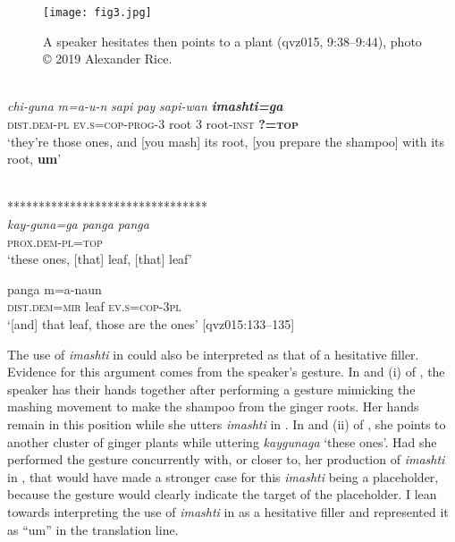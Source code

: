 \documentclass[output=paper]{langscibook}
\begin{document}
  
\begin{figure}
\texttt{[image: fig3.jpg]}
\caption{\label{fig:rice:3} A speaker hesitates then points to a plant (qvz015, 9:38--9:44), photo © 2019 Alexander Rice.}
 \end{figure}

\ea%
\label{ex:rice:5}
\ea \label{ex:rice:5a}
    \glll {} {} {} {} {} {}\\
    {\textit{chi-guna}}  {{\textit{m=a-u-n}}}    {\textit{sapi}}   {\textit{pay}}   {\textit{sapi-wan}} {\textbf{\textit{imashti=ga}}}\\
	{\textsc{dist.dem-pl}}  {\textsc{ev.s=cop-prog-3}}  {root}  {3}  {root-\textsc{inst}}  {\textbf{\textsc{?=top}}}\\
    \glt ‘they’re those ones, and [you mash] its root, [you prepare the shampoo] with its root, \textbf{um}’
\medskip

\ex   \label{ex:rice:5b}
 \\
{********************************}\\
{\textit{kay-guna=ga {\hspace{1cm}} panga {\hspace{0.5cm}} panga}}\\
{\textsc{prox.dem-pl=top {\hspace{0.2cm}} {} {\hspace{1cm}}{}}}\\
\glt ‘these ones, [that] leaf, [that] leaf’
\medskip

\ex \label{ex:rice:5c}  
 {panga}  {m=a-naun}\\
\textsc{dist.dem=mir}    {leaf}  {\textsc{ev.s=cop-3pl}}\\
\glt   ‘[and] that leaf, those are the ones’ [qvz015:133--135]
\z
\z

The use of \textit{imashti} in  could also be interpreted as that of a hesitative filler. Evidence for this argument comes from the speaker’s gesture. In  and (i) of , the speaker has their hands together after performing a gesture mimicking the mashing movement to make the shampoo from the ginger roots. Her hands remain in this position while she utters \textit{imashti} in . In  and (ii) of , she points to another cluster of ginger plants while uttering \textit{kaygunaga} ‘these ones’. Had she performed the gesture concurrently with, or closer to, her production of \textit{imashti} in , that would have made a stronger case for this \textit{imashti} being a placeholder, because the gesture would clearly indicate the target of the placeholder. I lean towards interpreting the use of \textit{imashti} in  as a hesitative filler and represented it as “um” in the translation line.
\end{document}
